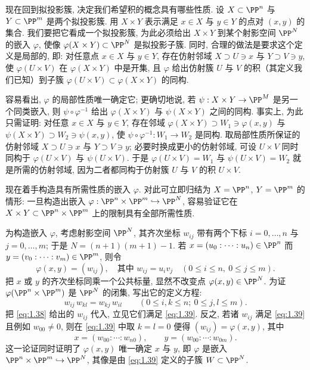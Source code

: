现在回到拟投影簇, 决定我们希望积的概念具有哪些性质. 设 $X \subset \PP^n$ 与 $Y \subset \PP^m$ 是两个拟投影簇. 用 $X \times Y$ 表示满足 $x \in X$ 与 $y \in Y$ 的点对 $(x, y)$ 的集合. 我们要把它看成一个拟投影簇, 为此必须给出 $X \times Y$ 到某个射影空间 $\PP^N$ 的嵌入 $\varphi$, 使像 $\varphi(X \times Y) \subset \PP^N$ 是拟投影子簇. 同时, 合理的做法是要求这个定义是局部的, 即: 对任意点 $x \in X$ 与 $y \in Y$, 存在仿射邻域 $X \supset U \ni x$ 与 $Y \supset V \ni y$, 使 $\varphi(U \times V)$ 在 $\varphi(X \times Y)$ 中是开集, 且 $\varphi$ 给出仿射簇 $U$ 与 $V$ 的积（其定义我们已知）到子簇 $\varphi(U \times V) \subset \varphi(X \times Y)$ 的同构.

容易看出, $\varphi$ 的局部性质唯一确定它; 更确切地说, 若 $\psi: X \times Y \to \PP^M$ 是另一个同类嵌入, 则 $\psi \circ \varphi^{-1}$ 给出 $\varphi(X \times Y)$ 与 $\psi(X \times Y)$ 之间的同构. 事实上, 为此只需证明: 对任意 $x \in X$ 与 $y \in Y$, 存在邻域 $\varphi(X \times Y) \supset W_1 \ni \varphi(x,y)$ 与 $\psi(X \times Y) \supset W_2 \ni \psi(x,y)$, 使 $\psi \circ \varphi^{-1}: W_1 \to W_2$ 是同构. 取局部性质所保证的仿射邻域 $X \supset U \ni x$ 与 $Y \supset V \ni y$; 必要时换成更小的仿射邻域, 可设 $U \times V$ 同时同构于 $\varphi(U \times V)$ 与 $\psi(U \times V)$. 于是 $\varphi(U \times V) = W_1$ 与 $\psi(U \times V) = W_2$ 就是所需的仿射邻域, 因为二者都同构于仿射簇 $U$ 与 $V$ 的积 $U \times V$.

现在着手构造具有所需性质的嵌入 $\varphi$. 对此可立即归结为 $X = \PP^n$, $Y = \PP^m$ 的情形: 一旦构造出嵌入 $\varphi: \PP^n \times \PP^m \hookrightarrow \PP^N$, 容易验证它在 $X \times Y \subset \PP^n \times \PP^m$ 上的限制具有全部所需性质.

为构造嵌入 $\varphi$, 考虑射影空间 $\PP^N$, 其齐次坐标 $w_{ij}$ 带有两个下标 $i = 0, \ldots, n$ 与 $j = 0, \ldots, m$; 于是 $N = (n+1)(m+1) - 1$. 若 $x = (u_0 : \cdots : u_n) \in \PP^n$ 而 $y = (v_0 : \cdots : v_m) \in \PP^m$, 则令
\begin{equation}
	\label{eq:1.38}
	\varphi(x, y) = (w_{ij}), \quad \text{其中 } w_{ij} = u_i v_j \quad (0 \le i \le n,\ 0 \le j \le m).
\end{equation}
把 $x$ 或 $y$ 的齐次坐标同乘一个公共标量, 显然不改变点 $\varphi(x,y) \in \PP^N$. 为证 $\varphi(\PP^n \times \PP^m)$ 是 $\PP^N$ 的闭集, 写出它的定义方程:
\begin{equation}
	\label{eq:1.39}
	w_{ij}\, w_{kl} = w_{kj}\, w_{il} \qquad (0 \le i, k \le n;\ 0 \le j, l \le m).
\end{equation}
把 \eqref{eq:1.38} 给出的 $w_{ij}$ 代入, 立见它们满足 \eqref{eq:1.39}. 反之, 若诸 $w_{ij}$ 满足 \eqref{eq:1.39} 且例如 $w_{00} \ne 0$, 则在 \eqref{eq:1.39} 中取 $k = l = 0$ 便得 $(w_{ij}) = \varphi(x, y)$, 其中
\[
	x = (w_{00} : \cdots : w_{n0}), \qquad y = (w_{00} : \cdots : w_{0m}).
\]
这一论证同时证明了 $\varphi(x,y)$ 唯一确定 $x$ 与 $y$, 即 $\varphi$ 是嵌入 $\PP^n \times \PP^m \hookrightarrow \PP^N$, 其像是由 \eqref{eq:1.39} 定义的子簇 $W \subset \PP^N$.

